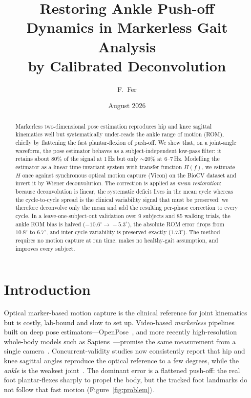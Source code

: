 \documentclass[11pt]{article}
\title{\textbf{Restoring Ankle Push-off Dynamics in Markerless Gait Analysis\\ by Calibrated Deconvolution}}
\author[1]{F.\ Fer}
\affil[1]{\small Institut de Myologie --- \texttt{myogait} technical report (proto-article)}
\date{August 2026}
\begin{document}
\maketitle
\vspace{-1.2em}

\begin{abstract}\noindent\small
Markerless two-dimensional pose estimation reproduces hip and knee sagittal kinematics well but systematically under-reads the ankle range of motion (ROM), chiefly by flattening the fast plantar-flexion of push-off. We show that, on a joint-angle waveform, the pose estimator behaves as a subject-independent low-pass filter: it retains about 80\% of the signal at 1\,Hz but only $\sim$20\% at 6--7\,Hz. Modelling the estimator as a linear time-invariant system with transfer function $H(f)$, we estimate $H$ once against synchronous optical motion capture (Vicon) on the BioCV dataset and invert it by Wiener deconvolution. The correction is applied as \emph{mean restoration}: because deconvolution is linear, the systematic deficit lives in the mean cycle whereas the cycle-to-cycle spread is the clinical variability signal that must be preserved; we therefore deconvolve only the mean and add the resulting per-phase correction to every cycle. In a leave-one-subject-out validation over 9 subjects and 85 walking trials, the ankle ROM bias is halved ($-10.6^\circ\!\to\!-5.3^\circ$), the absolute ROM error drops from $10.8^\circ$ to $6.7^\circ$, and inter-cycle variability is preserved exactly ($1.73^\circ$). The method requires no motion capture at run time, makes no healthy-gait assumption, and improves every subject.
\end{abstract}

\section{Introduction}
Optical marker-based motion capture is the clinical reference for joint kinematics but is costly, lab-bound and slow to set up. Video-based \emph{markerless} pipelines built on deep pose estimators---OpenPose~\cite{openpose}, and more recently high-resolution whole-body models such as Sapiens~\cite{sapiens}---promise the same measurement from a single camera~\cite{colyer2018}. Concurrent-validity studies now consistently report that hip and knee sagittal angles reproduce the optical reference to a few degrees, while the \emph{ankle} is the weakest joint~\cite{kanko2021,needham2021}. The dominant error is a flattened push-off: the real foot plantar-flexes sharply to propel the body, but the tracked foot landmarks do not follow that fast motion (Figure~\ref{fig:problem}).
\end{document}

